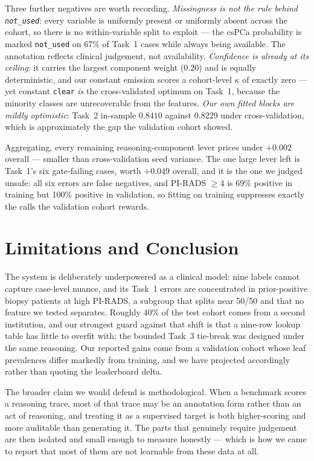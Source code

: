 \documentclass[runningheads]{llncs}
\newcommand{\code}[1]{\texttt{\small #1}}
\begin{document}
Three further negatives are worth recording. \emph{Missingness is not the rule
behind \code{not\_used}}: every variable is uniformly present or uniformly absent
across the cohort, so there is no within-variable split to exploit --- the
csPCa probability is marked \code{not\_used} on 67\% of Task~1 cases while always
being available. The annotation reflects clinical judgement, not availability.
\emph{Confidence is already at its ceiling}: it carries the largest component
weight ($0.20$) and is equally deterministic, and our constant emission scores a
cohort-level $\kappa$ of exactly zero --- yet constant \code{clear} \emph{is} the
cross-validated optimum on Task~1, because the minority classes are unrecoverable
from the features. \emph{Our own fitted blocks are mildly optimistic}: Task~2
in-sample $0.8410$ against $0.8229$ under cross-validation, which is approximately
the gap the validation cohort showed.

Aggregating, every remaining reasoning-component lever prices under $+0.002$
overall --- smaller than cross-validation seed variance. The one large lever left is
Task~1's six gate-failing cases, worth $+0.049$ overall, and it is the one we
judged unsafe: all six errors are false negatives, and PI-RADS $\geq 4$ is 69\%
positive in training but 100\% positive in validation, so fitting on training
suppresses exactly the calls the validation cohort rewards.

\section{Limitations and Conclusion}

The system is deliberately underpowered as a clinical model: nine labels cannot
capture case-level nuance, and its Task~1 errors are concentrated in prior-positive
biopsy patients at high PI-RADS, a subgroup that splits near 50/50 and that no
feature we tested separates. Roughly 40\% of the test cohort comes from a second
institution, and our strongest guard against that shift is that a nine-row lookup
table has little to overfit with; the bounded Task~3 tie-break was designed under
the same reasoning. Our reported gains come from a validation cohort whose leaf
prevalences differ markedly from training, and we have projected accordingly rather
than quoting the leaderboard delta.

The broader claim we would defend is methodological. When a benchmark scores a
reasoning trace, most of that trace may be an annotation form rather than an act of
reasoning, and treating it as a supervised target is both higher-scoring and more
auditable than generating it. The parts that genuinely require judgement are then
isolated and small enough to measure honestly --- which is how we came to report
that most of them are not learnable from these data at all.
\end{document}
